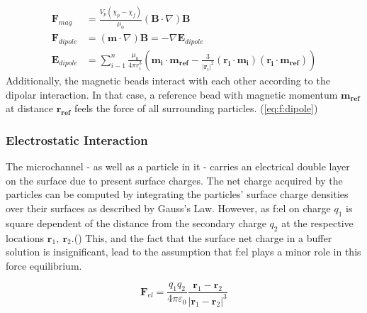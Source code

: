 \begin{align}	
	\mathbf{F}_{mag} &=\frac{V_{p}\left(\chi_{p}-\chi_{f}\right)}{\mu_{0}}(\mathbf{B} \cdot \nabla) \mathbf{B} \label{eq:f:mag}	\\
	\mathbf{F}_{dipole} &=\left(\mathbf{m}\cdot \nabla \right) \mathbf{B} = -\nabla \mathbf{E}_{dipole}\\
	\mathbf{E}_{dipole}&=\sum_{i-1}^{n} \frac{\mu_{0}}{4 \pi r_{i}^{3}}\left(\mathbf{m}_{\mathbf{i}} \cdot \mathbf{m}_{\mathbf{ref}}-\frac{3}{|\mathbf{r}_{i}|^{2}}\left(\mathbf{r}_{\mathbf{i}} \cdot \mathbf{m}_{\mathbf{i}}\right)\left(\mathbf{r}_{\mathbf{i}} \cdot \mathbf{m}_{\mathbf{ref}}\right)\right)  \label{eq:f:dipole}
\end{align}
Additionally, the magnetic beads interact with each other according to the dipolar interaction. In that case, a reference bead with magnetic momentum $\mathbf{m}_{\mathbf{ref}}$ at distance $\mathbf{r}_{\mathbf{ref}}$ feels the force of all surrounding particles. (\cref{eq:f:dipole})


\subsubsection{Electrostatic Interaction}
The microchannel - as well as a particle in it - carries an electrical double layer on the surface due to present surface charges. The net charge acquired by the particles can be computed by integrating the particles’ surface charge densities over their surfaces as described by Gauss’s Law. However, as \gls{f:el} on charge $q_1$ is square dependent of the distance from the secondary charge $q_2$ at the respective locations $\mathbf{r}_{1},\ \mathbf{r}_{2}$.() This, and the fact that the surface net charge in a buffer solution is insignificant, lead to the assumption that \gls{f:el} plays a minor role in this force equilibrium. 

\begin{equation}
	\mathbf{F}_{el}=\frac{q_{1} q_{2}}{4 \pi \varepsilon_{0}} \frac{\mathbf{r}_{1}-\mathbf{r}_{2}}{\left|\mathbf{r}_{1}-\mathbf{r}_{2}\right|^{3}} \label{eq:f:el}
\end{equation}

